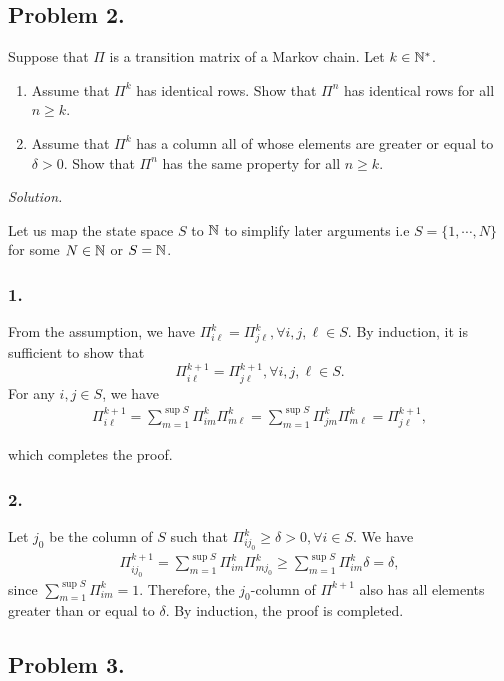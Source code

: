 \subsection*{Problem 2.} Suppose that $\Pi$ is a transition matrix of a Markov chain. Let $k\in{\mathbb{N}}^*$.
\begin{enumerate}
    \item Assume that $\Pi^k$ has identical rows. Show that $\Pi^n$ has identical rows for all $n\ge k$.
    \item Assume that $\Pi^k$ has a column all of whose elements are greater or equal to $\delta > 0$. Show that $\Pi^n$ has the same property for all $n \ge k$.
\end{enumerate}

\textit{Solution.} 

Let us map the state space $S$ to ${\mathbb{N}}$ to simplify later arguments i.e $S = \{1,\cdots, N\}$ for some $N\in{\mathbb{N}}$ or $S = {\mathbb{N}}$.
\subsubsection*{1.} From the assumption, we have $\Pi^k_{i\ell} = \Pi^k_{j\ell}, \forall i,j,\ell\in S$. By induction, it is sufficient to show that $$\Pi^{k+1}_{i\ell}=\Pi^{k+1}_{j\ell}, \forall i,j,\ell\in S.$$
For any $i,j\in S$, we have
\begin{align*}
    \Pi^{k+1}_{i\ell} = \sum\limits_{m=1}^{\sup S} \Pi^{k}_{im} \Pi^{k}_{m\ell}  = \sum\limits_{m=1}^{\sup S} \Pi^{k}_{jm} \Pi^{k}_{m\ell} = \Pi^{k+1}_{j\ell},
\end{align*}

which completes the proof.

\subsubsection*{2.} Let $j_0$ be the column of $S$ such that $\Pi^k_{ij_0} \ge \delta > 0,\forall i\in S$. We have
\begin{align*}
\Pi^{k+1}_{ij_0} 
= \sum\limits_{m=1}^{\sup S} \Pi^{k}_{im} \Pi^{k}_{mj_0}
\ge \sum\limits_{m=1}^{\sup S} \Pi^{k}_{im} \delta
= \delta,
\end{align*}
since $\sum\limits_{m=1}^{\sup S} \Pi^{k}_{im}=1$. Therefore, the $j_0$-column of $\Pi^{k+1}$ also has all elements greater than or equal to $\delta$. By induction, the proof is completed.

\subsection*{Problem 3.} 